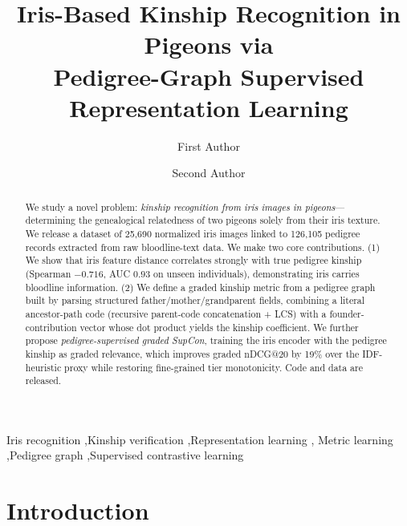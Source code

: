 \documentclass[review,3p]{elsarticle}
\begin{document}
\begin{frontmatter}
\title{Iris-Based Kinship Recognition in Pigeons via\\
Pedigree-Graph Supervised Representation Learning}

\author[a]{First Author}
\author[a]{Second Author}


\begin{abstract}
We study a novel problem: \emph{kinship recognition from iris images in pigeons}---determining the genealogical relatedness of two pigeons solely from their iris texture. We release a dataset of 25{,}690 normalized iris images linked to 126{,}105 pedigree records extracted from raw bloodline-text data. We make two core contributions. (1) We show that iris feature distance correlates strongly with true pedigree kinship (Spearman $-0.716$, AUC $0.93$ on unseen individuals), demonstrating iris carries bloodline information. (2) We define a graded kinship metric from a pedigree graph built by parsing structured father/mother/grandparent fields, combining a literal ancestor-path code (recursive parent-code concatenation + LCS) with a founder-contribution vector whose dot product yields the kinship coefficient. We further propose \emph{pedigree-supervised graded SupCon}, training the iris encoder with the pedigree kinship as graded relevance, which improves graded nDCG@20 by 19\% over the IDF-heuristic proxy while restoring fine-grained tier monotonicity. Code and data are released.
\end{abstract}

\begin{keyword}
Iris recognition \sep Kinship verification \sep Representation learning \sep
Metric learning \sep Pedigree graph \sep Supervised contrastive learning
\end{keyword}
\end{frontmatter}

\linenumbers


\section{Introduction}
\label{sec:intro}
\end{document}
